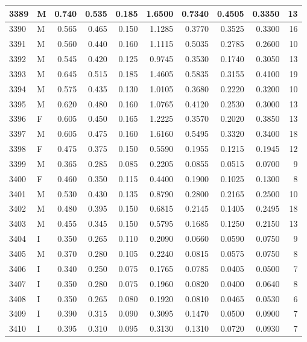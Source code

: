 \documentclass[9pt,twocolumn,twoside,]{pnas-new}
\begin{document}
\begin{tabular}{l|l|r|r|r|r|r|r|r|r}
\hline
3389 & M & 0.740 & 0.535 & 0.185 & 1.6500 & 0.7340 & 0.4505 & 0.3350 & 13\\
\hline
3390 & M & 0.565 & 0.465 & 0.150 & 1.1285 & 0.3770 & 0.3525 & 0.3300 & 16\\
\hline
3391 & M & 0.560 & 0.440 & 0.160 & 1.1115 & 0.5035 & 0.2785 & 0.2600 & 10\\
\hline
3392 & M & 0.545 & 0.420 & 0.125 & 0.9745 & 0.3530 & 0.1740 & 0.3050 & 13\\
\hline
3393 & M & 0.645 & 0.515 & 0.185 & 1.4605 & 0.5835 & 0.3155 & 0.4100 & 19\\
\hline
3394 & M & 0.575 & 0.435 & 0.130 & 1.0105 & 0.3680 & 0.2220 & 0.3200 & 10\\
\hline
3395 & M & 0.620 & 0.480 & 0.160 & 1.0765 & 0.4120 & 0.2530 & 0.3000 & 13\\
\hline
3396 & F & 0.605 & 0.450 & 0.165 & 1.2225 & 0.3570 & 0.2020 & 0.3850 & 13\\
\hline
3397 & M & 0.605 & 0.475 & 0.160 & 1.6160 & 0.5495 & 0.3320 & 0.3400 & 18\\
\hline
3398 & F & 0.475 & 0.375 & 0.150 & 0.5590 & 0.1955 & 0.1215 & 0.1945 & 12\\
\hline
3399 & M & 0.365 & 0.285 & 0.085 & 0.2205 & 0.0855 & 0.0515 & 0.0700 & 9\\
\hline
3400 & F & 0.460 & 0.350 & 0.115 & 0.4400 & 0.1900 & 0.1025 & 0.1300 & 8\\
\hline
3401 & M & 0.530 & 0.430 & 0.135 & 0.8790 & 0.2800 & 0.2165 & 0.2500 & 10\\
\hline
3402 & M & 0.480 & 0.395 & 0.150 & 0.6815 & 0.2145 & 0.1405 & 0.2495 & 18\\
\hline
3403 & M & 0.455 & 0.345 & 0.150 & 0.5795 & 0.1685 & 0.1250 & 0.2150 & 13\\
\hline
3404 & I & 0.350 & 0.265 & 0.110 & 0.2090 & 0.0660 & 0.0590 & 0.0750 & 9\\
\hline
3405 & M & 0.370 & 0.280 & 0.105 & 0.2240 & 0.0815 & 0.0575 & 0.0750 & 8\\
\hline
3406 & I & 0.340 & 0.250 & 0.075 & 0.1765 & 0.0785 & 0.0405 & 0.0500 & 7\\
\hline
3407 & I & 0.350 & 0.280 & 0.075 & 0.1960 & 0.0820 & 0.0400 & 0.0640 & 8\\
\hline
3408 & I & 0.350 & 0.265 & 0.080 & 0.1920 & 0.0810 & 0.0465 & 0.0530 & 6\\
\hline
3409 & I & 0.390 & 0.315 & 0.090 & 0.3095 & 0.1470 & 0.0500 & 0.0900 & 7\\
\hline
3410 & I & 0.395 & 0.310 & 0.095 & 0.3130 & 0.1310 & 0.0720 & 0.0930 & 7\\

\end{tabular}
\end{document}

